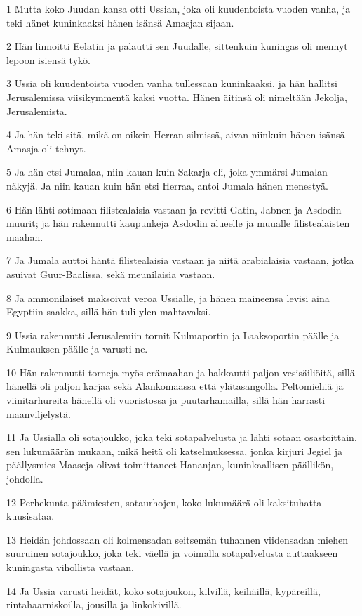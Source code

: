\par 1 Mutta koko Juudan kansa otti Ussian, joka oli kuudentoista vuoden vanha, ja teki hänet kuninkaaksi hänen isänsä Amasjan sijaan.
\par 2 Hän linnoitti Eelatin ja palautti sen Juudalle, sittenkuin kuningas oli mennyt lepoon isiensä tykö.
\par 3 Ussia oli kuudentoista vuoden vanha tullessaan kuninkaaksi, ja hän hallitsi Jerusalemissa viisikymmentä kaksi vuotta. Hänen äitinsä oli nimeltään Jekolja, Jerusalemista.
\par 4 Ja hän teki sitä, mikä on oikein Herran silmissä, aivan niinkuin hänen isänsä Amasja oli tehnyt.
\par 5 Ja hän etsi Jumalaa, niin kauan kuin Sakarja eli, joka ymmärsi Jumalan näkyjä. Ja niin kauan kuin hän etsi Herraa, antoi Jumala hänen menestyä.
\par 6 Hän lähti sotimaan filistealaisia vastaan ja revitti Gatin, Jabnen ja Asdodin muurit; ja hän rakennutti kaupunkeja Asdodin alueelle ja muualle filistealaisten maahan.
\par 7 Ja Jumala auttoi häntä filistealaisia vastaan ja niitä arabialaisia vastaan, jotka asuivat Guur-Baalissa, sekä meunilaisia vastaan.
\par 8 Ja ammonilaiset maksoivat veroa Ussialle, ja hänen maineensa levisi aina Egyptiin saakka, sillä hän tuli ylen mahtavaksi.
\par 9 Ussia rakennutti Jerusalemiin tornit Kulmaportin ja Laaksoportin päälle ja Kulmauksen päälle ja varusti ne.
\par 10 Hän rakennutti torneja myös erämaahan ja hakkautti paljon vesisäiliöitä, sillä hänellä oli paljon karjaa sekä Alankomaassa että ylätasangolla. Peltomiehiä ja viinitarhureita hänellä oli vuoristossa ja puutarhamailla, sillä hän harrasti maanviljelystä.
\par 11 Ja Ussialla oli sotajoukko, joka teki sotapalvelusta ja lähti sotaan osastoittain, sen lukumäärän mukaan, mikä heitä oli katselmuksessa, jonka kirjuri Jegiel ja päällysmies Maaseja olivat toimittaneet Hananjan, kuninkaallisen päällikön, johdolla.
\par 12 Perhekunta-päämiesten, sotaurhojen, koko lukumäärä oli kaksituhatta kuusisataa.
\par 13 Heidän johdossaan oli kolmensadan seitsemän tuhannen viidensadan miehen suuruinen sotajoukko, joka teki väellä ja voimalla sotapalvelusta auttaakseen kuningasta vihollista vastaan.
\par 14 Ja Ussia varusti heidät, koko sotajoukon, kilvillä, keihäillä, kypäreillä, rintahaarniskoilla, jousilla ja linkokivillä.
